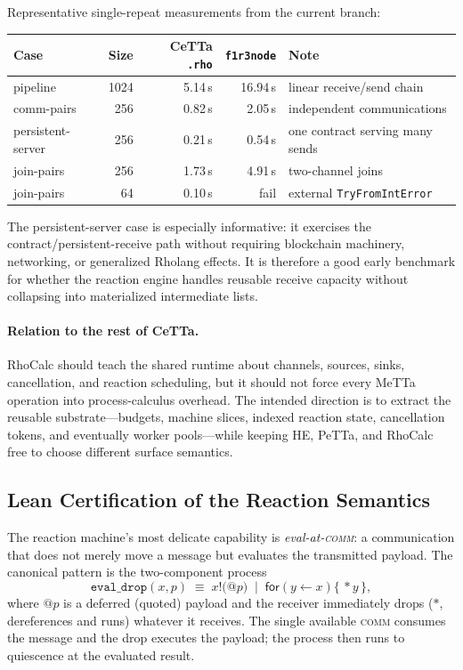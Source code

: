 \documentclass[11pt]{article}
\newcommand{\code}[1]{\texttt{#1}}
\newcommand{\PeTTa}{\textup{PeTTa}}
\newcommand{\HE}{\textup{HE}}
\newcommand{\CeTTa}{\textup{CeTTa}}
\newcommand{\RhoCalc}{\textup{RhoCalc}}
\begin{document}
Representative single-repeat measurements from the current branch:
\begin{center}
\begin{tabular}{lrrrl}
\toprule
Case & Size & \CeTTa{} \code{.rho} & \code{f1r3node} & Note \\
\midrule
pipeline & 1024 & 5.14\,s & 16.94\,s & linear receive/send chain \\
comm-pairs & 256 & 0.82\,s & 2.05\,s & independent communications \\
persistent-server & 256 & 0.21\,s & 0.54\,s & one contract serving many sends \\
join-pairs & 256 & 1.73\,s & 4.91\,s & two-channel joins \\
join-pairs & 64 & 0.10\,s & fail & external \code{TryFromIntError} \\
\bottomrule
\end{tabular}
\end{center}

The persistent-server case is especially informative: it exercises the
contract/persistent-receive path without requiring blockchain machinery,
networking, or generalized Rholang effects.  It is therefore a good early
benchmark for whether the reaction engine handles reusable receive capacity
without collapsing into materialized intermediate lists.

\paragraph{Relation to the rest of \CeTTa{}.}
\RhoCalc{} should teach the shared runtime about channels, sources, sinks,
cancellation, and reaction scheduling, but it should not force every MeTTa
operation into process-calculus overhead.  The intended direction is to extract
the reusable substrate---budgets, machine slices, indexed reaction state,
cancellation tokens, and eventually worker pools---while keeping \HE{},
\PeTTa{}, and \RhoCalc{} free to choose different surface semantics.

\subsection{Lean Certification of the Reaction Semantics}
\label{sec:rho-lean}

The reaction machine's most delicate capability is \emph{eval-at-\textsc{comm}}:
a communication that does not merely move a message but evaluates the
transmitted payload.  The canonical pattern is the two-component process
\[
  \texttt{eval\_drop}(x, p)\;\equiv\;
  x!\big(@p\big)\;\mid\;\mathsf{for}(y \leftarrow x)\{\,*y\,\},
\]
where $@p$ is a deferred (quoted) payload and the receiver immediately drops
($*$, dereferences and runs) whatever it receives.  The single available
\textsc{comm} consumes the message and the drop executes the payload; the
process then runs to quiescence at the evaluated result.
\end{document}
